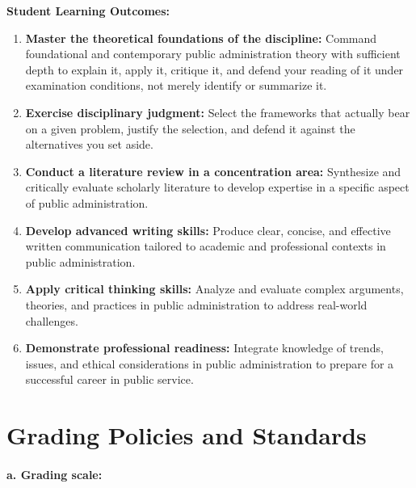 \documentclass[11pt]{article}     %
\begin{document}
\vspace{1em}
\noindent \textbf{Student Learning Outcomes:}
\begin{enumerate}
    \item \textbf{Master the theoretical foundations of the discipline:} Command foundational and contemporary public administration theory with sufficient depth to explain it, apply it, critique it, and defend your reading of it under examination conditions, not merely identify or summarize it.
    \item \textbf{Exercise disciplinary judgment:} Select the frameworks that actually bear on a given problem, justify the selection, and defend it against the alternatives you set aside.
    \item \textbf{Conduct a literature review in a concentration area:} Synthesize and critically evaluate scholarly literature to develop expertise in a specific aspect of public administration.
    \item \textbf{Develop advanced writing skills:} Produce clear, concise, and effective written communication tailored to academic and professional contexts in public administration.
    \item \textbf{Apply critical thinking skills:} Analyze and evaluate complex arguments, theories, and practices in public administration to address real-world challenges.
    \item \textbf{Demonstrate professional readiness:} Integrate knowledge of trends, issues, and ethical considerations in public administration to prepare for a successful career in public service.
\end{enumerate}

\section*{Grading Policies and Standards}

\paragraph*{a. Grading scale:}
\end{document}

